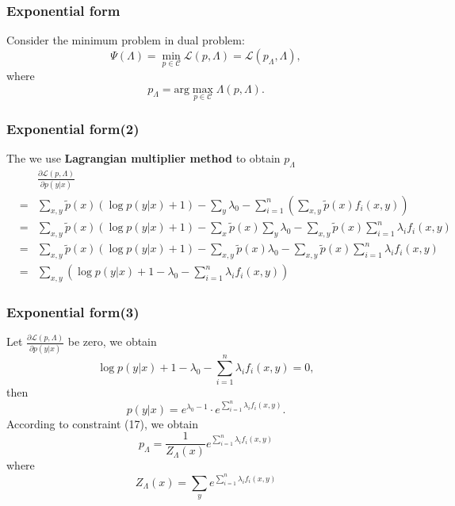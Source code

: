 \documentclass[slidestop,compress,mathserif]{beamer}
\begin{document}
	\begin{frame}
		\frametitle{Exponential form}
		Consider the minimum problem in dual problem:
		\begin{equation}
			\Psi(\Lambda) = \min_{p\in\mathcal{C}}\mathcal{L}(p,\Lambda) = \mathcal{L}(p_\Lambda,\Lambda),
		\end{equation}
		where
		\begin{equation}
			p_\Lambda = \mathrm{arg}\max_{p\in\mathcal{C}}\Lambda(p,\Lambda).
		\end{equation}
		
		
	\end{frame}
		
	\begin{frame}
		\frametitle{Exponential form(2)}
		The we use \textbf{Lagrangian multiplier method} to obtain $p_\Lambda$
		\begin{eqnarray*}
			&&\frac{\partial\mathcal{L}(p,\Lambda)}{\partial p(y|x)} \\
			&=& \sum_{x,y}\widetilde{p}(x)(\log p(y|x) +1) - \sum_y\lambda_0 - \sum_{i=1}^{n}\left(\sum_{x,y}\widetilde{p}(x)f_i(x,y)\right)\\
			&=& \sum_{x,y}\widetilde{p}(x)(\log p(y|x) +1) - \sum_x\widetilde{p}(x)\sum_y\lambda_0 - \sum_{x,y}\widetilde{p}(x)\sum_{i=1}^{n}\lambda_i f_i(x,y)\\
			&=& \sum_{x,y}\widetilde{p}(x)(\log p(y|x) +1) - \sum_{x,y}\widetilde{p}(x)\lambda_0 - \sum_{x,y}\widetilde{p}(x)\sum_{i=1}^{n}\lambda_i f_i(x,y)\\
			&=& \sum_{x,y}\left(\log p(y|x) +1 -\lambda_0 -\sum_{i=1}^{n}\lambda_i f_i(x,y) \right)
		\end{eqnarray*}
	\end{frame}
	
	\begin{frame}
		\frametitle{Exponential form(3)}
		Let $\frac{\partial\mathcal{L}(p,\Lambda)}{\partial p(y|x)}$ be zero, we obtain
		\begin{equation}
			\log p(y|x) +1 -\lambda_0 -\sum_{i=1}^{n}\lambda_i f_i(x,y) = 0,
		\end{equation}
		then
		\begin{equation}
			p(y|x) = e^{\lambda_0-1}\cdot e^{\sum_{i=1}^{n}\lambda_i f_i(x,y)}.
		\end{equation}
		According to constraint (17), we obtain
		\begin{equation}
			p_\Lambda = \frac{1}{Z_\Lambda(x)}e^{\sum_{i=1}^{n}\lambda_i f_i(x,y)}
		\end{equation}
		where
		\begin{equation}
			Z_\Lambda(x) = \sum_y e^{\sum_{i=1}^{n}\lambda_i f_i(x,y)}
		\end{equation}
	\end{frame}
	
\end{document}
